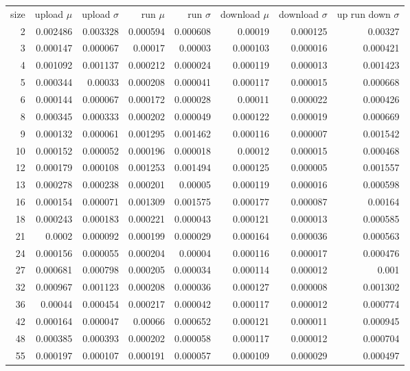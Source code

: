 \begin{tabular}{r r r r r r r r}
size & upload $\mu$  & upload $\sigma$ & run $\mu$ & run $\sigma$ & download $\mu$ & download $\sigma$ & up run down $\sigma$ \\
2 & 0.002486 & 0.003328 & 0.000594 & 0.000608 & 0.00019 & 0.000125 & 0.00327 \\
3 & 0.000147 & 0.000067 & 0.00017 & 0.00003 & 0.000103 & 0.000016 & 0.000421 \\
4 & 0.001092 & 0.001137 & 0.000212 & 0.000024 & 0.000119 & 0.000013 & 0.001423 \\
5 & 0.000344 & 0.00033 & 0.000208 & 0.000041 & 0.000117 & 0.000015 & 0.000668 \\
6 & 0.000144 & 0.000067 & 0.000172 & 0.000028 & 0.00011 & 0.000022 & 0.000426 \\
8 & 0.000345 & 0.000333 & 0.000202 & 0.000049 & 0.000122 & 0.000019 & 0.000669 \\
9 & 0.000132 & 0.000061 & 0.001295 & 0.001462 & 0.000116 & 0.000007 & 0.001542 \\
10 & 0.000152 & 0.000052 & 0.000196 & 0.000018 & 0.00012 & 0.000015 & 0.000468 \\
12 & 0.000179 & 0.000108 & 0.001253 & 0.001494 & 0.000125 & 0.000005 & 0.001557 \\
13 & 0.000278 & 0.000238 & 0.000201 & 0.00005 & 0.000119 & 0.000016 & 0.000598 \\
16 & 0.000154 & 0.000071 & 0.001309 & 0.001575 & 0.000177 & 0.000087 & 0.00164 \\
18 & 0.000243 & 0.000183 & 0.000221 & 0.000043 & 0.000121 & 0.000013 & 0.000585 \\
21 & 0.0002 & 0.000092 & 0.000199 & 0.000029 & 0.000164 & 0.000036 & 0.000563 \\
24 & 0.000156 & 0.000055 & 0.000204 & 0.00004 & 0.000116 & 0.000017 & 0.000476 \\
27 & 0.000681 & 0.000798 & 0.000205 & 0.000034 & 0.000114 & 0.000012 & 0.001 \\
32 & 0.000967 & 0.001123 & 0.000208 & 0.000036 & 0.000127 & 0.000008 & 0.001302 \\
36 & 0.00044 & 0.000454 & 0.000217 & 0.000042 & 0.000117 & 0.000012 & 0.000774 \\
42 & 0.000164 & 0.000047 & 0.00066 & 0.000652 & 0.000121 & 0.000011 & 0.000945 \\
48 & 0.000385 & 0.000393 & 0.000202 & 0.000058 & 0.000117 & 0.000012 & 0.000704 \\
55 & 0.000197 & 0.000107 & 0.000191 & 0.000057 & 0.000109 & 0.000029 & 0.000497 \\

\end{tabular}
